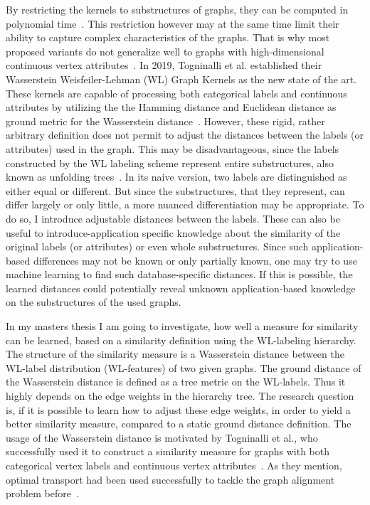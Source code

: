 By restricting the kernels to substructures of graphs, they can be computed in polynomial time~\cite{2008_Hofmann_CONF}. 
This restriction however may at the same time limit their ability to capture complex characteristics of the graphs. 
That is why most proposed variants do not generalize well to graphs with high-dimensional continuous vertex attributes~\cite{2011_Shervashidze_JMLR}. 
In 2019, Togninalli et al. established their Wasserstein Weisfeiler-Lehman (WL) Graph Kernels as the new state of the art.
These kernels are capable of processing both categorical labels and continuous attributes by utilizing the the Hamming distance and Euclidean distance as ground metric for the Wasserstein distance~\cite{2019_Togninalli_NIPS}.
However, these rigid, rather arbitrary definition does not permit to adjust the distances between the labels (or attributes) used in the graph.
This may be disadvantageous, since the labels constructed by the WL labeling scheme represent entire substructures, also known as unfolding trees~\cite{2021_Schulz_CONF}.
In its naive version, two labels are distinguished as either equal or different.
But since the substructures, that they represent, can differ largely or only little, 
a more nuanced differentiation may be appropriate.
To do so, I introduce adjustable distances between the labels.
These can also be useful to introduce-application specific knowledge about the similarity of the original labels (or attributes) or even whole substructures. 
Since such application-based differences may not be known or only partially known, one may try to use machine learning to find such database-specific distances. 
If this is possible, the learned distances could potentially reveal unknown application-based knowledge on the substructures of the used graphs. 

In my masters thesis I am going to investigate, how well a measure for similarity can be learned, based on a similarity definition using the WL-labeling hierarchy. 
The structure of the similarity measure is a Wasserstein distance between the WL-label distribution (WL-features) of two given graphs. 
The ground distance of the Wasserstein distance is defined as a tree metric on the WL-labels. 
Thus it highly depends on the edge weights in the hierarchy tree. 
The research question is, if it is possible to learn how to adjust these edge weights, in order to yield a better similarity measure, compared to a static ground distance definition. 
The usage of the Wasserstein distance is motivated by Togninalli et al., who successfully used it to construct a similarity measure for graphs with both categorical vertex labels and continuous vertex attributes~\cite{2019_Togninalli_NIPS}.
As they mention, optimal transport had been used successfully to tackle the graph alignment problem before~\cite{2019_Xu_CONF}.
%

